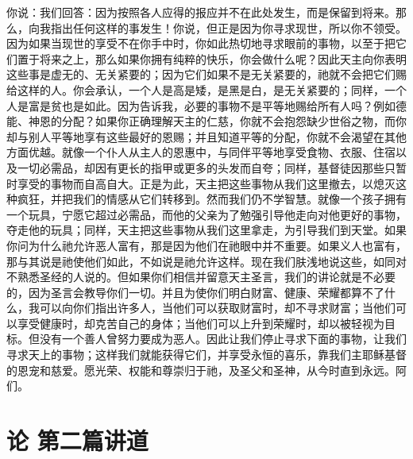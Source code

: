 你说：我们回答：因为按照各人应得的报应并不在此处发生，而是保留到将来。那么，向我指出任何这样的事发生！你说，但正是因为你寻求现世，所以你不领受。因为如果当现世的享受不在你手中时，你如此热切地寻求眼前的事物，以至于把它们置于将来之上，那么如果你拥有纯粹的快乐，你会做什么呢？因此天主向你表明这些事是虚无的、无关紧要的；因为它们如果不是无关紧要的，祂就不会把它们赐给这样的人。你会承认，一个人是高是矮，是黑是白，是无关紧要的；同样，一个人是富是贫也是如此。因为告诉我，必要的事物不是平等地赐给所有人吗？例如德能、神恩的分配？如果你正确理解天主的仁慈，你就不会抱怨缺少世俗之物，而你却与别人平等地享有这些最好的恩赐；并且知道平等的分配，你就不会渴望在其他方面优越。就像一个仆人从主人的恩惠中，与同伴平等地享受食物、衣服、住宿以及一切必需品，却因有更长的指甲或更多的头发而自夸；同样，基督徒因那些只暂时享受的事物而自高自大。正是为此，天主把这些事物从我们这里撤去，以熄灭这种疯狂，并把我们的情感从它们转移到。然而我们仍不学智慧。就像一个孩子拥有一个玩具，宁愿它超过必需品，而他的父亲为了勉强引导他走向对他更好的事物，夺走他的玩具；同样，天主把这些事物从我们这里拿走，为引导我们到天堂。如果你问为什么祂允许恶人富有，那是因为他们在祂眼中并不重要。如果义人也富有，那与其说是祂使他们如此，不如说是祂允许这样。现在我们肤浅地说这些，如同对不熟悉圣经的人说的。但如果你们相信并留意天主圣言，我们的讲论就是不必要的，因为圣言会教导你们一切。并且为使你们明白财富、健康、荣耀都算不了什么，我可以向你们指出许多人，当他们可以获取财富时，却不寻求财富；当他们可以享受健康时，却克苦自己的身体；当他们可以上升到荣耀时，却以被轻视为目标。但没有一个善人曾努力要成为恶人。因此让我们停止寻求下面的事物，让我们寻求天上的事物；这样我们就能获得它们，并享受永恒的喜乐，靠我们主耶稣基督的恩宠和慈爱。愿光荣、权能和尊崇归于祂，及圣父和圣神，从今时直到永远。阿们。\par



\section{论 第二篇讲道}

